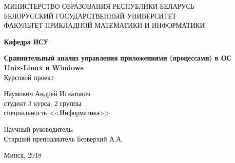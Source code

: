 \begin{titlepage}
    \begin{center}
	{ МИНИСТЕРСТВО ОБРАЗОВАНИЯ РЕСПУБЛИКИ БЕЛАРУСЬ} \\
        { БЕЛОРУССКИЙ ГОСУДАРСТВЕННЫЙ УНИВЕРСИТЕТ} \\
	{ ФАКУЛЬТЕТ ПРИКЛАДНОЙ МАТЕМАТИКИ И ИНФОРМАТИКИ} \\
    \end{center}
    \begin{center}
        {\bf Кафедра ИСУ}
    \end{center}

    \vspace{7em}

    \begin{center}
        {\bf Сравнительный анализ управления приложениями (процессами) в ОС Unix-Linux и Windows} \\
        \vspace{5mm}
        { Курсовой проект}
    \end{center}

    \vspace{8em}

    \begin{flushright}
        Наумович Андрей Игнатович\\
	студент 3 курса, 2 группы\\
	специальность <<Информатика>>
    \end{flushright}

    \begin{flushright}
        Научный руководитель:\\
	Старший преподаватель Безверхий А.А.\\
    \end{flushright}
    
    \vfill

    \begin{center}
        {\large Минск, 2018}
    \end{center}
\end{titlepage}
